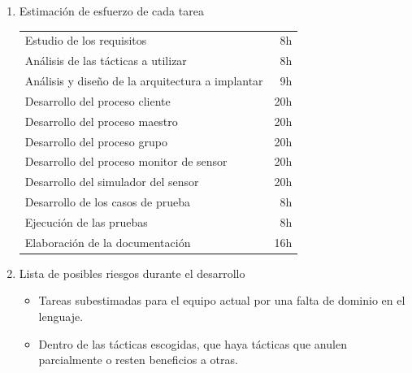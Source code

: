 \documentclass[a4paper,10pt]{article}
\begin{document}
\begin{enumerate}
  \item Estimación de esfuerzo de cada tarea
  \begin{table}[H]
    \centering
    \begin{tabular}{l r}
      Estudio de los requisitos & 8h \\
      Análisis de las tácticas a utilizar & 8h \\
      Análisis y diseño de la arquitectura a implantar & 9h \\
      Desarrollo del proceso cliente & 20h \\
      Desarrollo del proceso maestro & 20h \\
      Desarrollo del proceso grupo & 20h \\
      Desarrollo del proceso monitor de sensor & 20h \\
      Desarrollo del simulador del sensor & 20h \\
      Desarrollo de los casos de prueba & 8h \\
      Ejecución de las pruebas & 8h \\
      Elaboración de la documentación & 16h
    \end{tabular}
  \end{table}


  \item Lista de posibles riesgos durante el desarrollo
  \begin{itemize}
    \item Tareas subestimadas para el equipo actual por una falta de dominio en el lenguaje.
    \item Dentro de las tácticas escogidas, que haya tácticas que anulen parcialmente o resten beneficios a otras.
  \end{itemize}

\end{enumerate}
\end{document}
